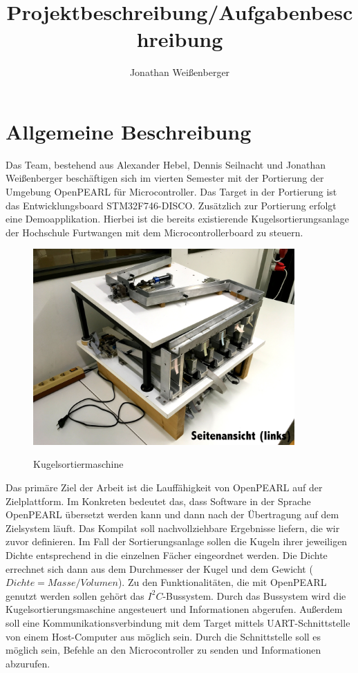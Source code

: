 \documentclass[12pt,a4paper]{article}
\author{Jonathan Weißenberger}
\title{Projektbeschreibung/Aufgabenbeschreibung}
\begin{document}
\maketitle
\newpage
\tableofcontents
\newpage
\section{Allgemeine Beschreibung}
Das Team, bestehend aus Alexander Hebel, Dennis Seilnacht und Jonathan Weißenberger beschäftigen sich im vierten Semester mit der Portierung der Umgebung OpenPEARL für Microcontroller. Das Target in der Portierung ist das Entwicklungsboard STM32F746-DISCO. Zusätzlich zur Portierung erfolgt eine Demoapplikation. Hierbei ist die bereits existierende Kugelsortierungsanlage der Hochschule Furtwangen mit dem Microcontrollerboard zu steuern.
\begin{figure}[h]
\begin{center}
\includegraphics[width=10cm]{grafiken/Seitenansicht.jpg}
\label{bild_kugelsortiermaschine}
\caption{Kugelsortiermaschine}
\end{center}
\end{figure}
Das primäre Ziel der Arbeit ist die Lauffähigkeit von OpenPEARL auf der Zielplattform. Im Konkreten bedeutet das, dass Software in der Sprache OpenPEARL übersetzt werden kann und dann nach der Übertragung auf dem Zielsystem läuft. Das Kompilat soll nachvollziehbare Ergebnisse liefern, die wir zuvor definieren. Im Fall der Sortierungsanlage sollen die Kugeln ihrer jeweiligen Dichte entsprechend in die einzelnen Fächer eingeordnet werden. Die Dichte errechnet sich dann aus dem Durchmesser der Kugel und dem Gewicht ($Dichte=Masse/Volumen$). Zu den Funktionalitäten, die mit OpenPEARL genutzt werden sollen gehört das $I^2C$-Bussystem. Durch das Bussystem wird die Kugelsortierungsmaschine angesteuert und Informationen abgerufen. Außerdem soll eine Kommunikationsverbindung mit dem Target mittels UART-Schnittstelle von einem Host-Computer aus möglich sein. Durch die Schnittstelle soll es möglich sein, Befehle an den Microcontroller zu senden und Informationen abzurufen. 
\end{document}

